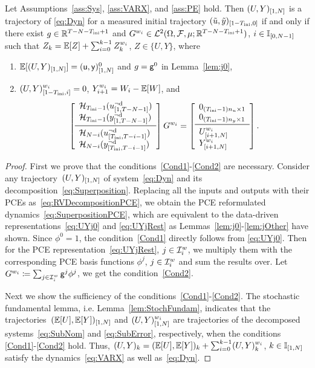 \begin{lem}\label{lem:PropRV}
	Let Assumptions~\ref{ass:Sys}, \ref{ass:VARX}, and \ref{ass:PE} hold.
	Then $(U,Y)_{[1,N]}$ is a trajectory of \eqref{eq:Dyn} for a measured initial trajectory $(\tilde{u},\tilde{y})_{[1-T_\text{ini},0]}$ if and only if there exist $g\in\mathbb{R}^{T-N-T_\text{ini}+1}$ and $G^{w_i}\in\mathcal{L}^2(\Omega, \mathcal{F}, \mu; \mathbb{R}^{T-N-T_\text{ini}+1})$, $i\in\mathbb{I}_{[0,N-1]}$ such that $Z_k = \mathbb{E}[Z] + \sum_{i=0}^{k-1} Z_k^{w_i}$, $Z\in\{U,Y\}$, where
	\begin{enumerate}[label=(\roman*)]
		\item\label{Cond1} $\mathbb{E}[(U,Y)_{[1,N]}]=(\mathsf{u},\mathsf{y})^0_{[1,N]}$ and $g=\mathsf{g}^0$ in Lemma~\ref{lem:j0},
		\item\label{Cond2}  $(U,Y)^{w_i}_{[1-T_\text{ini},i]} = 0$, $Y^{w_i}_{i+1} = W_i-\mathbb{E}[W]$, and
		\[
		\left[\begin{array}{ll} \Hankel_{\tini-1}(\traud{u}{1}{T-N-1})\\ \Hankel_{\tini-1}(\traud{y}{1}{T-N-1}) \\ \midrule \Hankel_{N-i}(\traud{u}{\tini}{T-i-1}) \\ \Hankel_{N-i}(\traud{y}{\tini}{T-i-1}) \end{array}\right] G^{w_i} 
		=\left[\begin{array}{ll} 0_{(\tini-1)\dimu\times1} \\ 0_{(\tini-1)\dimy\times1} \\ \midrule \tra{U^{w_i}}{i+1}{N} \\ \tra{Y^{w_i}}{i+1}{N} \end{array}\right].
		\]
	\end{enumerate}
\end{lem}
\begin{proof}
	First we prove that the conditions~\ref{Cond1}-\ref{Cond2} are necessary. Consider any trajectory~$(U,Y)_{[1,N]}$ of system~\eqref{eq:Dyn} and its decomposition~\eqref{eq:Superposition}. Replacing all the inputs and outputs with their PCEs as~\eqref{eq:RVDecompositionPCE}, we obtain the PCE reformulated dynamics~\eqref{eq:SuperpositionPCE}, which are equivalent to the data-driven representations~\eqref{eq:UYj0} and \eqref{eq:UYjRest} as Lemmas~\ref{lem:j0}-\ref{lem:jOther} have shown. Since $\phi^0=1$, the condition~\ref{Cond1} directly follows from \eqref{eq:UYj0}. Then for the PCE representation~\eqref{eq:UYjRest}, $j\in\mathcal{I}_{i}^w$, we multiply them with the corresponding PCE basis functions $\phi^j$, $j\in\mathcal{I}_{i}^w$ and sum the results over. Let $G^{w_i}\coloneqq \sum_{j\in\mathcal{I}_{i}^w}\mathsf{g}^j\phi^j$, we get the condition~\ref{Cond2}.
	
	Next we show the sufficiency of the conditions~\ref{Cond1}-\ref{Cond2}. The stochastic fundamental lemma, i.e. Lemma~\ref{lem:StochFundam}, indicates that the trajectories~$(\mathbb{E}[U],\mathbb{E}[Y])_{[1,N]}$ and $(U,Y)^{w_i}_{[1,N]}$ are trajectories of the decomposed systems~\eqref{eq:SubNom} and \eqref{eq:SubError}, respectively, when the conditions \ref{Cond1}-\ref{Cond2} hold. Thus, $(U,Y)_k = (\mathbb{E}[U],\mathbb{E}[Y])_k + \sum_{i=0}^{k-1} (U,Y)_k^{w_i}$, $k\in\mathbb{I}_{[1,N]}$ satisfy the dynamics~\eqref{eq:VARX} as well as~\eqref{eq:Dyn}.
\end{proof}
